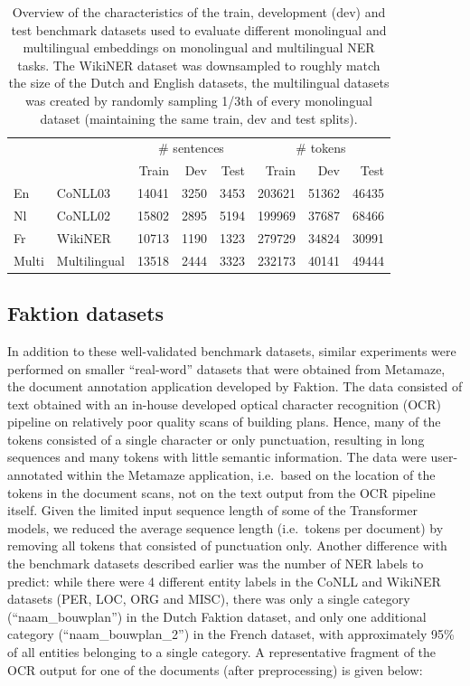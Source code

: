 \documentclass[12pt,a4paper,]{book}
\begin{document}
\begin{table}

\caption{\label{tab:benchmark-ds}Overview of the characteristics of the train, development (dev) and test benchmark datasets used to evaluate different monolingual and multilingual embeddings on monolingual and multilingual NER tasks. The WikiNER dataset was downsampled to roughly match the size of the Dutch and English datasets, the multilingual datasets was created by randomly sampling 1/3th of every monolingual dataset (maintaining the same train, dev and test splits).}
\centering
\begin{tabular}[t]{llrrrrrr}
\toprule
\multicolumn{2}{c}{ } & \multicolumn{3}{c}{\# sentences} & \multicolumn{3}{c}{\# tokens} \\
\cmidrule(l{3pt}r{3pt}){3-5} \cmidrule(l{3pt}r{3pt}){6-8}
 &  & Train & Dev & Test & Train & Dev & Test\\
\midrule
En & CoNLL03 & 14041 & 3250 & 3453 & 203621 & 51362 & 46435\\
Nl & CoNLL02 & 15802 & 2895 & 5194 & 199969 & 37687 & 68466\\
Fr & WikiNER & 10713 & 1190 & 1323 & 279729 & 34824 & 30991\\
Multi & Multilingual & 13518 & 2444 & 3323 & 232173 & 40141 & 49444\\
\bottomrule
\end{tabular}
\end{table}

\hypertarget{faktion-datasets}{%
\subsection{Faktion datasets}\label{faktion-datasets}}

In addition to these well-validated benchmark datasets, similar experiments were performed on smaller ``real-word'' datasets that were obtained from Metamaze, the document annotation application developed by Faktion. The data consisted of text obtained with an in-house developed optical character recognition (OCR) pipeline on relatively poor quality scans of building plans. Hence, many of the tokens consisted of a single character or only punctuation, resulting in long sequences and many tokens with little semantic information. The data were user-annotated within the Metamaze application, i.e.~based on the location of the tokens in the document scans, not on the text output from the OCR pipeline itself. Given the limited input sequence length of some of the Transformer models, we reduced the average sequence length (i.e.~tokens per document) by removing all tokens that consisted of punctuation only. Another difference with the benchmark datasets described earlier was the number of NER labels to predict: while there were 4 different entity labels in the CoNLL and WikiNER datasets (PER, LOC, ORG and MISC), there was only a single category (``naam\_bouwplan'') in the Dutch Faktion dataset, and only one additional category (``naam\_bouwplan\_2'') in the French dataset, with approximately 95\% of all entities belonging to a single category. A representative fragment of the OCR output for one of the documents (after preprocessing) is given below:
\end{document}
